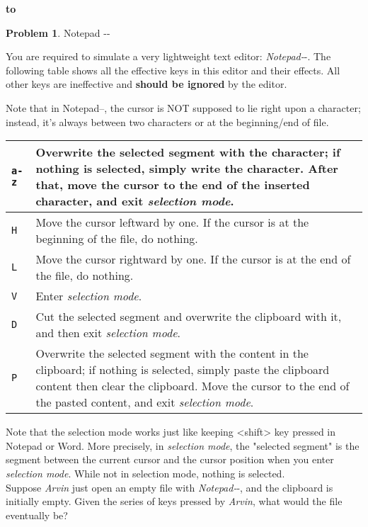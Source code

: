\documentclass[12pt,a4paper]{report}
\theoremstyle{definition}
\newtheorem{problem}{\textbf{Problem}}
\theoremstyle{definition}
\def\headline#1{\hbox to \hsize{\hrulefill\quad\lower.3em\hbox{#1}\quad\hrulefill}}
\def\headline#1{\hbox to \hsize{\hrulefill\quad\lower.3em\hbox{#1}\quad\hrulefill}}
\begin{document}
\vspace{5pt}
\begin{center}
\textbf{\headline{\large Programming Part}}
\end{center}
\begin{problem}Notepad -{}-

You are required to simulate a very lightweight text editor: \textit{Notepad-}-. The following table shows all the effective keys in this editor and their effects. All other keys are ineffective and {\bfseries should be ignored} by the editor.

Note that in Notepad--, the cursor is NOT supposed to lie right upon a character; instead, it's always between two characters or at the beginning/end of file.


\begin{table}[h]
\centering
\begin{tabularx}{\textwidth}{|l|X|}
\hline
\texttt{a-z} & Overwrite the selected segment with the character; if nothing is selected, simply write the character. After that, move the cursor to the end of the inserted character, and exit \textit{selection mode}.\\\hline
\texttt{H}   & Move the cursor leftward by one. If the cursor is at the beginning of the file, do nothing.\\\hline
\texttt{L}   & Move the cursor rightward by one. If the cursor is at the end of the file, do nothing.\\\hline
\texttt{V}   & Enter \textit{selection mode}.\\\hline
\texttt{D}   & Cut the selected segment and overwrite the clipboard with it, and then exit \textit{selection mode}.\\\hline
\texttt{P}   & Overwrite the selected segment with the content in the clipboard; if nothing is selected, simply paste the clipboard content then clear the clipboard. Move the cursor to the end of the pasted content, and exit \textit{selection mode}.\\\hline
\end{tabularx}
\end{table}

Note that the selection mode works just like keeping <shift> key pressed in Notepad or Word. More precisely, in \textit{selection mode}, the "selected segment" is the segment between the current cursor and the cursor position when you enter \textit{selection mode}. While not in selection mode, nothing is selected.\\
Suppose \textit{Arvin} just open an empty file with \textit{Notepad-}-, and the clipboard is initially empty. Given the series of keys pressed by \textit{Arvin}, what would the file eventually be?\\


\end{problem}
\end{document}
